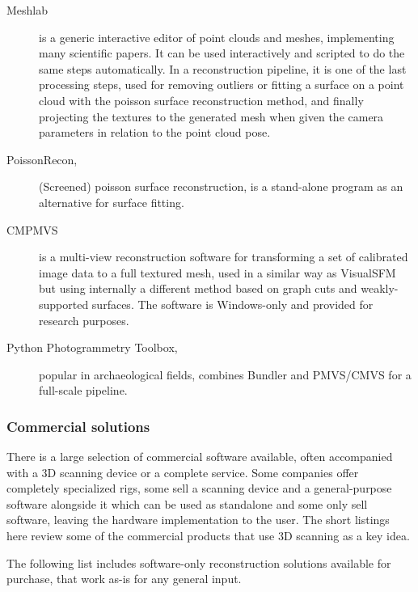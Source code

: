 \begin{description}
	\item[Meshlab] \cite{meshlab} is a generic interactive editor of point clouds and meshes, implementing many scientific papers.
		It can be used interactively and scripted to do the same steps automatically.
		In a reconstruction pipeline, it is one of the last processing steps, used for removing outliers or fitting a surface on a point cloud with the poisson surface reconstruction method, and finally projecting the textures to the generated mesh when given the camera parameters in relation to the point cloud pose.

	\item[PoissonRecon,] \cite{kazhdan2013screened} (Screened) poisson surface reconstruction, is a stand-alone program as an alternative for surface fitting.

	\item[CMPMVS] \cite{jancosek2011multi} is a multi-view reconstruction software for transforming a set of calibrated image data to a full textured mesh, used in a similar way as VisualSFM but using internally a different method based on graph cuts and weakly-supported surfaces.
		The software is Windows-only and provided for research purposes.

	\item[Python Photogrammetry Toolbox,] \cite{moulon2011python} popular in archaeological fields, combines Bundler and PMVS/CMVS for a full-scale pipeline.
\end{description}



\subsubsection{Commercial solutions} %

There is a large selection of commercial software available, often accompanied with a 3D scanning device or a complete service.
Some companies offer completely specialized rigs, some sell a scanning device and a general-purpose software alongside it which can be used as standalone and some only sell software, leaving the hardware implementation to the user.
The short listings here review some of the commercial products that use 3D scanning as a key idea.

The following list includes software-only reconstruction solutions available for purchase, that work as-is for any general input.

